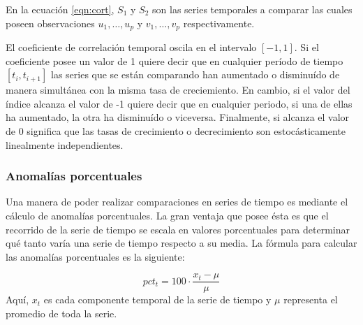      En la ecuación \ref{eqn:cort}, $S_1$ y $S_2$ son las series temporales a comparar las cuales poseen observaciones $ u_1,\dots,u_p $ y $ v_1,\dots,v_p$ respectivamente.

     El coeficiente de correlación temporal oscila en el intervalo $[-1,1]$. Si el coeficiente posee un valor de 1 quiere decir que en cualquier período de tiempo $[t_i,t_{i+1}]$ las series
     que se están comparando han aumentado o disminuído de manera simultánea con la misma tasa de creciemiento. En cambio, si el valor del índice alcanza el valor de -1 quiere decir que en cualquier periodo, si una de ellas ha
     aumentado, la otra ha disminuído o viceversa. Finalmente, si alcanza el valor de 0 significa que las tasas de crecimiento o decrecimiento son estocásticamente linealmente independientes\cite{27}.

     \subsubsection{Anomalías porcentuales}
     Una manera de poder realizar comparaciones en series de tiempo es mediante el cálculo de anomalías porcentuales. La gran ventaja que posee ésta es que el recorrido de la serie de tiempo
     se escala en valores porcentuales para determinar qué tanto varía una serie de tiempo respecto a su media. La fórmula para calcular las anomalías porcentuales es la siguiente:

    \begin{equation}\label{pct_anomalies}
        pct_t = 100 \cdot\frac{x_t-\mu}{\mu}
    \end{equation}
    Aquí, $x_t$ es cada componente temporal de la serie de tiempo y $\mu$ representa el promedio de toda la serie. 
